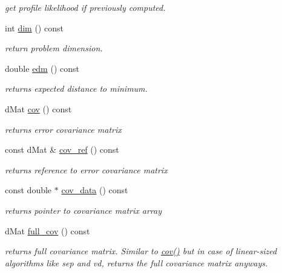 \begin{DoxyCompactItemize}
\begin{DoxyCompactList}\small\item\em get profile likelihood if previously computed. \end{DoxyCompactList}\item 
int \hyperlink{classlibcmaes_1_1CMASolutions_ac8d07f19d5e4cdbab456ef9d00acb16e}{dim} () const 
\begin{DoxyCompactList}\small\item\em return problem dimension. \end{DoxyCompactList}\item 
double \hyperlink{classlibcmaes_1_1CMASolutions_a33a5f2f6bc03c9b459d58f079a1a2d38}{edm} () const 
\begin{DoxyCompactList}\small\item\em returns expected distance to minimum. \end{DoxyCompactList}\item 
d\+Mat \hyperlink{classlibcmaes_1_1CMASolutions_a8b3cd4f1b85c820190eedbf81f49a441}{cov} () const 
\begin{DoxyCompactList}\small\item\em returns error covariance matrix \end{DoxyCompactList}\item 
const d\+Mat \& \hyperlink{classlibcmaes_1_1CMASolutions_a853dc543b4d2845df451ec112d00d311}{cov\+\_\+ref} () const 
\begin{DoxyCompactList}\small\item\em returns reference to error covariance matrix \end{DoxyCompactList}\item 
const double $\ast$ \hyperlink{classlibcmaes_1_1CMASolutions_a1db02206c1f0b90b935a47c923c5373d}{cov\+\_\+data} () const 
\begin{DoxyCompactList}\small\item\em returns pointer to covariance matrix array \end{DoxyCompactList}\item 
d\+Mat \hyperlink{classlibcmaes_1_1CMASolutions_ab15bbf74888aea18cd1e05d04190f01a}{full\+\_\+cov} () const 
\begin{DoxyCompactList}\small\item\em returns full covariance matrix. Similar to \hyperlink{classlibcmaes_1_1CMASolutions_a8b3cd4f1b85c820190eedbf81f49a441}{cov()} but in case of linear-\/sized algorithms like sep and vd, returns the full covariance matrix anyways. \end{DoxyCompactList}\item 

\end{DoxyCompactItemize}
